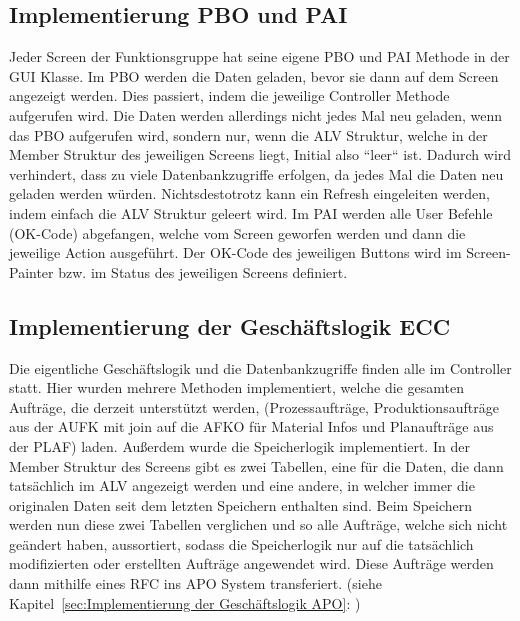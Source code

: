 \subsection{Implementierung PBO und PAI}
\label{sec:Implementierung PBO und PAI}
Jeder Screen der Funktionsgruppe hat seine eigene \ac{PBO} und \ac{PAI} Methode in der GUI Klasse. Im PBO werden die Daten geladen, bevor sie dann auf dem Screen angezeigt werden. Dies passiert, indem die jeweilige Controller Methode aufgerufen wird. Die Daten werden allerdings nicht jedes Mal neu geladen, wenn das \ac{PBO} aufgerufen wird, sondern nur, wenn die ALV Struktur, welche in der Member Struktur des jeweiligen Screens liegt, Initial also ``leer`` ist. Dadurch wird verhindert, dass zu viele Datenbankzugriffe erfolgen, da jedes Mal die Daten neu geladen werden würden. Nichtsdestotrotz kann ein Refresh eingeleiten werden, indem einfach die \ac{ALV} Struktur geleert wird. Im \ac{PAI} werden alle User Befehle (OK-Code) abgefangen, welche vom Screen geworfen werden und dann die jeweilige Action ausgeführt. Der OK-Code des jeweiligen Buttons wird im Screen-Painter bzw. im Status des jeweiligen Screens definiert.

\subsection{Implementierung der Geschäftslogik ECC}
\label{sec:Implementierung der Geschäftslogik ECC}
Die eigentliche Geschäftslogik und die Datenbankzugriffe finden alle im Controller statt. Hier wurden mehrere Methoden implementiert, welche die gesamten Aufträge, die derzeit unterstützt werden, (Prozessaufträge, Produktionsaufträge aus der AUFK mit join auf die AFKO für Material Infos und Planaufträge aus der PLAF) laden. Außerdem wurde die Speicherlogik implementiert. In der Member Struktur des Screens gibt es zwei Tabellen, eine für die Daten, die dann tatsächlich im \ac{ALV} angezeigt werden und eine andere, in welcher immer die originalen Daten seit dem letzten Speichern enthalten sind. Beim Speichern werden nun diese zwei Tabellen verglichen und so alle Aufträge, welche sich nicht geändert haben, aussortiert, sodass die Speicherlogik nur auf die tatsächlich modifizierten oder erstellten Aufträge angewendet wird. Diese Aufträge werden dann mithilfe eines RFC ins \ac{APO} System transferiert. (siehe Kapitel~\ref{sec:Implementierung der Geschäftslogik APO}: )     

